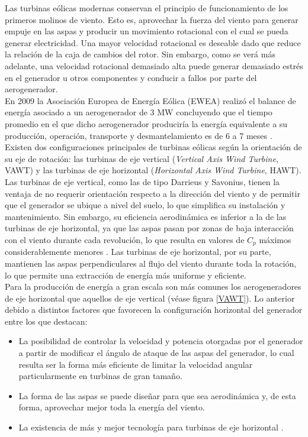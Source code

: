 Las turbinas eólicas modernas conservan el principio de funcionamiento de los primeros molinos 
de viento. Esto es, aprovechar la fuerza del viento para generar empuje en las aspas y producir 
un movimiento rotacional con el cual se pueda generar electricidad. Una mayor velocidad rotacional 
es deseable dado que reduce la relación de la caja de cambios del rotor. Sin embargo, como 
se verá más adelante, una velocidad rotacional demasiado alta puede generar demasiado estrés 
en el generador u otros componentes y conducir a fallos por parte del aerogenerador. 
\\

En 2009 la Asociación Europea de Energía Eólica (EWEA) realizó el balance de energía asociado 
a un aerogenerador de 3 MW concluyendo que el tiempo promedio en el que dicho aerogenerador 
produciría la energía equivalente a su producción, operación, transporte y desmantelamiento 
es de 6 a 7 meses \cite{Burton2011}.
\\

Existen dos configuraciones principales de turbinas eólicas según la 
orientación de su eje de rotación: las turbinas de eje vertical 
(\emph{Vertical Axis Wind Turbine}, VAWT) y las turbinas de eje horizontal 
(\emph{Horizontal Axis Wind Turbine}, HAWT). Las turbinas de eje vertical, 
como las de tipo Darrieus y Savonius, tienen la ventaja de no requerir 
orientación respecto a la dirección del viento y de permitir que el 
generador se ubique a nivel del suelo, lo que simplifica su instalación y 
mantenimiento. Sin embargo, su eficiencia aerodinámica es inferior a la de 
las turbinas de eje horizontal, ya que las aspas pasan por zonas de baja 
interacción con el viento durante cada revolución, lo que resulta en valores 
de $C_p$ máximos considerablemente menores \cite{Hau2013}. Las turbinas de 
eje horizontal, por su parte, mantienen las aspas perpendiculares al flujo 
del viento durante toda la rotación, lo que permite una extracción de 
energía más uniforme y eficiente.
\\

Para la producción de energía a gran escala son más comunes los aerogeneradores de eje 
horizontal que aquellos de eje vertical (véase figura \ref{VAWT}). Lo anterior debido a 
distintos factores que favorecen la configuración horizontal del generador entre los que destacan:

\begin{itemize}
\item La posibilidad de controlar la velocidad y potencia otorgadas por el generador a partir de 
modificar el ángulo de ataque de las aspas del generador, lo cual resulta ser la forma más 
eficiente de limitar la velocidad angular particularmente en turbinas de gran tamaño.
\item La forma de las aspas se puede diseñar para que sea aerodinámica y, de esta forma, 
aprovechar mejor toda la energía del viento.
\item La existencia de más y mejor tecnología para turbinas de eje horizontal \cite{Hau2013}.
\end{itemize}

